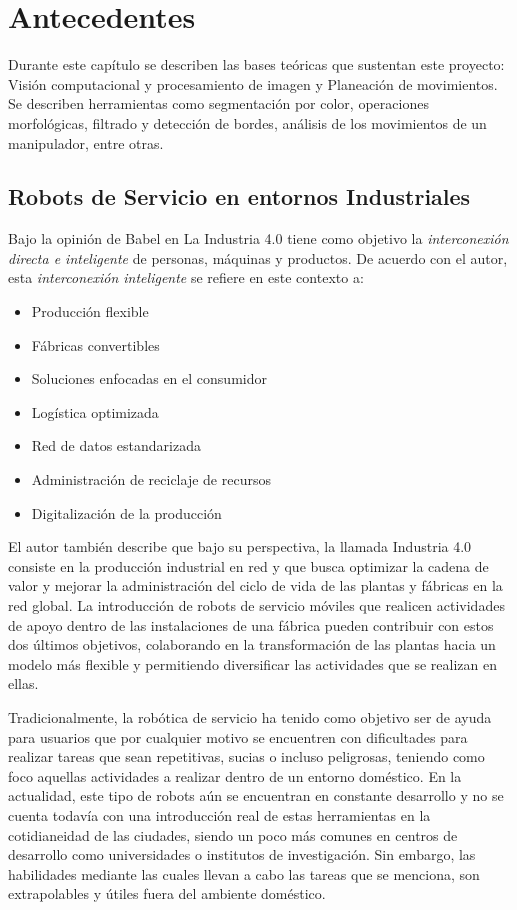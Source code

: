 \chapter{Antecedentes}
Durante este capítulo se describen las bases teóricas que sustentan este proyecto: Visión computacional y procesamiento de imagen y Planeación de movimientos. Se describen herramientas como segmentación por color, operaciones morfológicas, filtrado y detección de bordes, análisis de los movimientos de un manipulador, entre otras.

\section{Robots de Servicio en entornos Industriales}

Bajo la opinión de Babel en \cite{babel_industry_2022} La Industria 4.0 tiene como objetivo la \textit{interconexión directa e inteligente} de  personas, máquinas y productos. De acuerdo con el autor, esta \textit{interconexión inteligente} se refiere en este contexto a:
 \begin{itemize}
     \item Producción flexible
     \item Fábricas convertibles
     \item Soluciones enfocadas en el consumidor
     \item Logística optimizada
     \item Red de datos estandarizada
     \item Administración de reciclaje de recursos
     \item Digitalización de la producción
 \end{itemize}
 El autor también describe que bajo su perspectiva, la llamada Industria 4.0 consiste en la producción industrial en red y que busca optimizar la cadena de valor y mejorar la administración del ciclo de vida de las plantas y fábricas en la red global. La introducción de robots de servicio móviles que realicen actividades de apoyo dentro de las instalaciones de una fábrica pueden contribuir con estos dos últimos objetivos, colaborando en la transformación de las plantas hacia un modelo más flexible y permitiendo diversificar las actividades que se realizan en ellas.

Tradicionalmente, la robótica de servicio ha tenido como objetivo ser de ayuda para usuarios que por cualquier motivo se encuentren con dificultades para realizar tareas que sean repetitivas, sucias o incluso peligrosas, teniendo como foco aquellas actividades a realizar dentro de un entorno doméstico. En la actualidad, este tipo de robots aún se encuentran en constante desarrollo y no se cuenta todavía con una introducción real de estas herramientas en la cotidianeidad de las ciudades, siendo un poco más comunes en centros de desarrollo como universidades o institutos de investigación. Sin embargo, las habilidades mediante las cuales llevan a cabo las tareas que se menciona, son extrapolables y útiles fuera del ambiente doméstico. 

